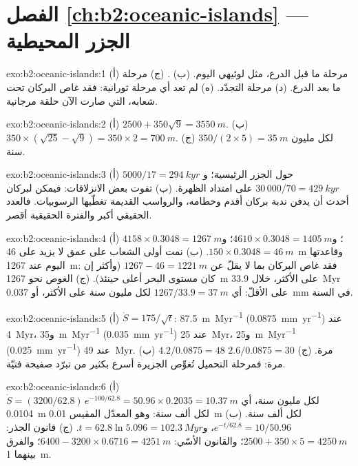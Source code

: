 \section*{الفصل \ref{ch:b2:oceanic-islands} --- الجزر المحيطية}

\begin{solution}{exo:b2:oceanic-islands:1}
(أ) مرحلة ما قبل الدرع، مثل لوئيهي اليوم. (ب) . (ج) مرحلة ما بعد الدرع. (د) مرحلة
التجدّد. (ه) لم تعد أي مرحلة ثورانية: فقد غاص البركان تحت شعابه، التي صارت الآن حلقة مرجانية.
\end{solution}

\begin{solution}{exo:b2:oceanic-islands:2}
(أ) $2500 + 350\sqrt9 = \qty{3550}{m}$. (ب) $350\times(\sqrt{25} - \sqrt9) = 350\times2 =
\qty{700}{m}$. (ج) $350/(2\times5) = \qty{35}{m}$ لكل مليون سنة.
\end{solution}

\begin{solution}{exo:b2:oceanic-islands:3}
(أ) $5000/17 = \qty{294}{kyr}$ حول الجزر الرئيسية؛ و$30\,000/70 = \qty{429}{kyr}$ على امتداد
الظهرة. (ب) تفوت بعض الانزلاقات: فيمكن لبركان أحدث أن يدفن ندبة بركان أقدم وحطامه،
والرواسب القديمة تغطّيها الرسوبيات. فالعدد الحقيقي أكبر والفترة الحقيقية
أقصر.
\end{solution}

\begin{solution}{exo:b2:oceanic-islands:4}
(أ) $4158\times0.3048 = \qty{1267}{m}$؛ و$4610\times0.3048 = \qty{1405}{m}$؛ و$150\times0.3048 =
\qty{46}{m}$. (ب) نمت أولى الشعاب على عمق لا يزيد على \qty{46}{m} وقاعدتها اليوم عند
\qty{1267}{m}: فقد غاص البركان بما لا يقلّ عن $1267 - 46 = \qty{1221}{m}$ (وأكثر إن كان مستوى البحر
أعلى حينئذ). (ج) الغوص نحو \qty{1267}{m} على الأكثر، خلال \qty{33.9}{Myr} على الأقلّ:
أي $1267/33.9 = \qty{37}{m}$ لكل مليون سنة على الأكثر، أو \qty{0.037}{mm} في السنة.
\end{solution}

\begin{solution}{exo:b2:oceanic-islands:5}
(أ) $\dot S = 175/\sqrt t$: \qty{87.5}{m.Myr^{-1}} (\qty{0.0875}{mm.yr^{-1}}) عند \qty{4}{Myr}،
و\qty{35}{m.Myr^{-1}} (\qty{0.035}{mm.yr^{-1}}) عند \qty{25}{Myr}، و\qty{25}{m.Myr^{-1}}
(\qty{0.025}{mm.yr^{-1}}) عند \qty{49}{Myr}. (ب) $4.2/0.0875 = 48$ مرة. (ج) $2.6/0.0875 = 30$
مرة: فمرحلة التحميل تُغوِّص الجزيرة أسرع بكثير من تبرّد صفيحة فتيّة.
\end{solution}

\begin{solution}{exo:b2:oceanic-islands:6}
(أ) $\dot S = (3200/62.8)\,e^{-100/62.8} = 50.96\times0.2035 = \qty{10.37}{m}$ لكل مليون سنة،
أي \qty{0.0104}{m} لكل ألف سنة: وهو المعدّل المقيس \qty{0.01}{m} لكل ألف سنة. (ب) $e^{-t/62.8}
= 10/50.96$، و$t = 62.8\ln5.096 = \qty{102.3}{Myr}$. (ج) قانون الجذر: $2500 + 350\times5 =
\qty{4250}{m}$؛ والقانون الأسّي: $6400 - 3200\times0.6716 = \qty{4251}{m}$؛ والفرق بينهما
\qty{1}{m}.
\end{solution}

